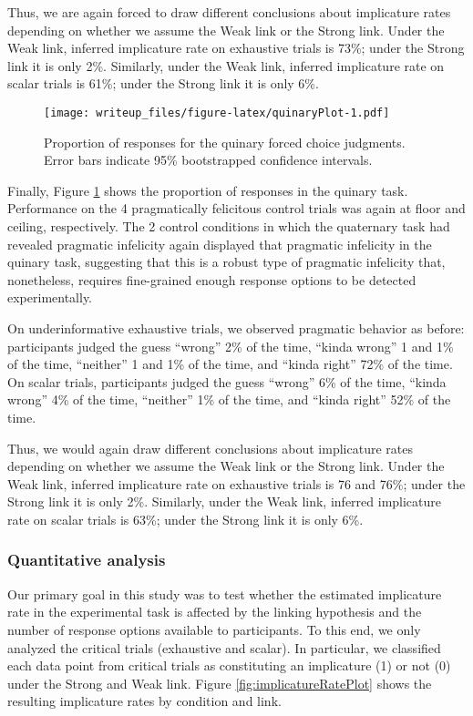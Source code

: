 \documentclass[man]{apa6}
\theoremstyle{definition}
\theoremstyle{definition}
\theoremstyle{definition}
\theoremstyle{remark}
\begin{document}
Thus, we are again forced to draw different conclusions about
implicature rates depending on whether we assume the Weak link or the
Strong link. Under the Weak link, inferred implicature rate on
exhaustive trials is 73\%; under the Strong link it is only 2\%.
Similarly, under the Weak link, inferred implicature rate on scalar
trials is 61\%; under the Strong link it is only 6\%.

\begin{figure}
\centering
\texttt{[image: writeup\_files/figure-latex/quinaryPlot-1.pdf]}
\caption{\label{fig:quinaryPlot}Proportion of responses for the quinary
forced choice judgments. Error bars indicate 95\% bootstrapped
confidence intervals.}
\end{figure}

Finally, Figure \ref{fig:quinaryPlot} shows the proportion of responses
in the quinary task. Performance on the 4 pragmatically felicitous
control trials was again at floor and ceiling, respectively. The 2
control conditions in which the quaternary task had revealed pragmatic
infelicity again displayed that pragmatic infelicity in the quinary
task, suggesting that this is a robust type of pragmatic infelicity
that, nonetheless, requires fine-grained enough response options to be
detected experimentally.

On underinformative exhaustive trials, we observed pragmatic behavior as
before: participants judged the guess \enquote{wrong} 2\% of the time,
\enquote{kinda wrong} 1 and 1\% of the time, \enquote{neither} 1 and 1\%
of the time, and \enquote{kinda right} 72\% of the time. On scalar
trials, participants judged the guess \enquote{wrong} 6\% of the time,
\enquote{kinda wrong} 4\% of the time, \enquote{neither} 1\% of the
time, and \enquote{kinda right} 52\% of the time.

Thus, we would again draw different conclusions about implicature rates
depending on whether we assume the Weak link or the Strong link. Under
the Weak link, inferred implicature rate on exhaustive trials is 76 and
76\%; under the Strong link it is only 2\%. Similarly, under the Weak
link, inferred implicature rate on scalar trials is 63\%; under the
Strong link it is only 6\%.

\subsubsection{Quantitative analysis}\label{quantitative-analysis}

Our primary goal in this study was to test whether the estimated
implicature rate in the experimental task is affected by the linking
hypothesis and the number of response options available to participants.
To this end, we only analyzed the critical trials (exhaustive and
scalar). In particular, we classified each data point from critical
trials as constituting an implicature (1) or not (0) under the Strong
and Weak link. Figure \ref{fig:implicatureRatePlot} shows the resulting
implicature rates by condition and link.
\end{document}
